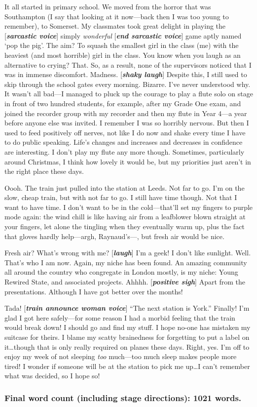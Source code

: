 \documentclass[11pt,a4paper]{article}
\begin{document}
It all started in primary school.  We moved from the horror that was Southampton (I say that looking at it now---back then I was too young to remember), to Somerset.  My classmates took great delight in playing the [\textsl{\textbf{sarcastic voice}}] simply \textit{wonderful} [\textsl{\textbf{end sarcastic voice}}] game aptly named `pop the pig'.  The aim?  To squash the smallest girl in the class (me) with the heaviest (and most horrible) girl in the class.  You know when you laugh as an alternative to crying?  That.  So, as a result, none of the supervisors noticed that I was in immense discomfort.  Madness.  [\textsl{\textbf{shaky laugh}}]  Despite this, I still used to skip through the school gates every morning.  Bizarre.  I've never understood why.  It wasn't all bad---I managed to pluck up the courage to play a flute solo on stage in front of two hundred students, for example, after my Grade One exam, and joined the recorder group with my recorder and then my flute in Year 4---a year before anyone else was invited.  I remember I was so horribly nervous.  But then I used to feed positively off nerves, not like I do now and shake every time I have to do public speaking.  Life's changes and increases and decreases in confidence are interesting.  I don't play my flute any more though.  Sometimes, particularly around Christmas, I think how lovely it would be, but my priorities just aren't in the right place these days.

Oooh.  The train just pulled into the station at Leeds.  Not far to go.  I'm on the slow, cheap train, but with not far to go.  I still have time though.  Not that I want to have time.  I don't want to be in the cold---that'll set my fingers to purple mode again: the wind chill is like having air from a leafblower blown straight at your fingers, let alone the tingling when they eventually warm up, plus the fact that gloves hardly help---argh, Raynaud's---, but fresh air would be nice.

Fresh air?  What's wrong with me?  [\textsl{\textbf{laugh}}]  I'm a geek!  I don't like sunlight.  Well.  That's who I am now.  Again, my niche has been found.  An amazing community all around the country who congregate in London mostly, is my niche: Young Rewired State, and associated projects.  Ahhhh.  [\textsl{\textbf{positive sigh}}]  Apart from the presentations.  Although I have got better over the months!

Tada!  [\textsl{\textbf{train announce woman voice}}]  ``The next station is York.''  Finally!  I'm glad I got here safely---for some reason I had a morbid feeling that the train would break down!  I should go and find my stuff.  I hope no-one has mistaken my suitcase for theirs.  I blame my scatty brainedness for forgetting to put a label on it\ldots though that is only really required on planes these days.  Right, yes.  I'm off to enjoy my week of not sleeping \textsl{too} much---too much sleep makes people more tired!  I wonder if someone will be at the station to pick me up\ldots I can't remember what was decided, so I hope so!

\begin{center}
	\subsubsection*{Final word count (including stage directions): 1021 words.}
\end{center}
\end{document}
